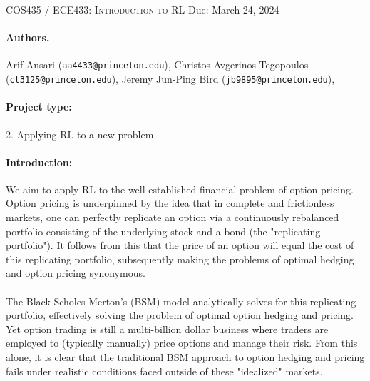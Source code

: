 \documentclass{article}
\begin{document}
\newcommand{\lectureTitle}{Project Proposal: Optimal Option Hedging and Pricing}
\newcommand{\lectureDate}{Due: March 24, 2024}

\textsc{COS435 / ECE433: Introduction to RL} \hfill \lectureDate
\vspace{1em}

\maketitle

\paragraph{Authors.} Arif Ansari (\texttt{aa4433@princeton.edu}), Christos Avgerinos Tegopoulos (\texttt{ct3125@princeton.edu}), Jeremy Jun-Ping Bird (\texttt{jb9895@princeton.edu}), 

\paragraph{Project type:}
2. 
Applying RL to a new problem

\paragraph{Introduction:}
We aim to apply RL to the well-established financial problem of option pricing. Option pricing is underpinned by the idea that in complete and frictionless markets, one can perfectly replicate an option via a continuously rebalanced portfolio consisting of the underlying stock and a bond (the "replicating portfolio"). It follows from this that the price of an option will equal the cost of this replicating portfolio, subsequently making the problems of optimal hedging and option pricing synonymous.\\\\
The Black-Scholes-Merton's (BSM) model analytically solves for this replicating portfolio, effectively solving the problem of optimal option hedging and pricing. Yet option trading is still a multi-billion dollar business where traders are employed to (typically manually) price options and manage their risk. From this alone, it is clear that the traditional BSM approach to option hedging and pricing fails under realistic conditions faced outside of these "idealized" markets.
\end{document}
